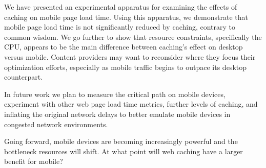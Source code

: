 We have presented an experimental apparatus for examining the effects of caching on mobile page load time.
Using this apparatus, we demonstrate that mobile page load time is not significantly reduced by caching, contrary to common wisdom.
We go further to show that resource constraints, specifically the CPU, appears to be the main difference between caching's effect on desktop versus mobile.
Content providers may want to reconsider where they focus their optimization efforts, especially as mobile traffic begins to outpace its desktop counterpart.

In future work we plan to measure the critical path on mobile devices, experiment with other web page load time metrics, further levels of caching, and inflating the original network delays to better emulate mobile devices in congested network environments. 

Going forward, mobile devices are becoming increasingly powerful and the bottleneck resources will shift. At what point will web caching have a larger benefit for mobile?  



